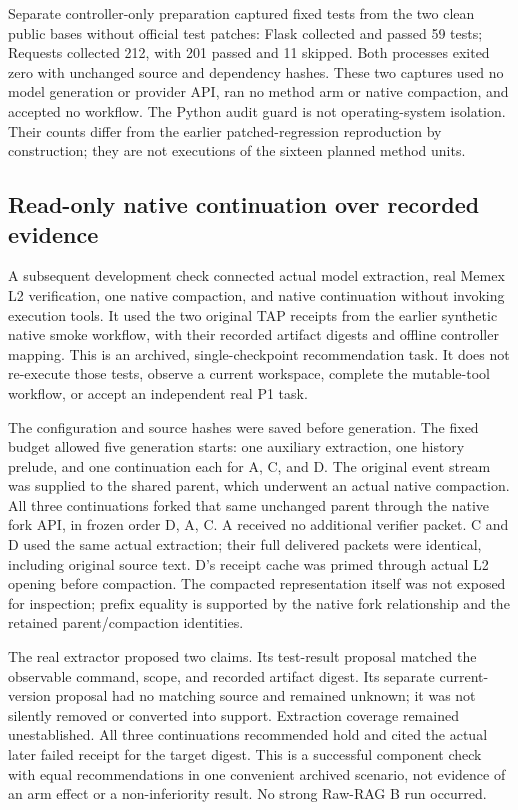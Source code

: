 Separate controller-only preparation captured fixed tests from the two
clean public bases without official test patches: Flask collected and
passed 59 tests; Requests collected 212, with 201 passed and 11 skipped.
Both processes exited zero with unchanged source and dependency hashes.
These two captures used no model generation or provider API, ran no
method arm or native compaction, and accepted no workflow. The Python
audit guard is not operating-system isolation. Their counts differ from
the earlier patched-regression reproduction by construction; they are
not executions of the sixteen planned method units.

\subsection{Read-only native continuation over recorded
evidence}\label{read-only-native-continuation-over-recorded-evidence}

A subsequent development check connected actual model extraction, real
Memex L2 verification, one native compaction, and native continuation
without invoking execution tools. It used the two original TAP receipts
from the earlier synthetic native smoke workflow, with their recorded
artifact digests and offline controller mapping. This is an archived,
single-checkpoint recommendation task. It does not re-execute those
tests, observe a current workspace, complete the mutable-tool workflow,
or accept an independent real P1 task.

The configuration and source hashes were saved before generation. The
fixed budget allowed five generation starts: one auxiliary extraction,
one history prelude, and one continuation each for A, C, and D. The
original event stream was supplied to the shared parent, which underwent
an actual native compaction. All three continuations forked that same
unchanged parent through the native fork API, in frozen order D, A, C. A
received no additional verifier packet. C and D used the same actual
extraction; their full delivered packets were identical, including
original source text. D's receipt cache was primed through actual L2
opening before compaction. The compacted representation itself was not
exposed for inspection; prefix equality is supported by the native fork
relationship and the retained parent/compaction identities.

The real extractor proposed two claims. Its test-result proposal matched
the observable command, scope, and recorded artifact digest. Its
separate current-version proposal had no matching source and remained
unknown; it was not silently removed or converted into support.
Extraction coverage remained unestablished. All three continuations
recommended hold and cited the actual later failed receipt for the
target digest. This is a successful component check with equal
recommendations in one convenient archived scenario, not evidence of an
arm effect or a non-inferiority result. No strong Raw-RAG B run
occurred.

